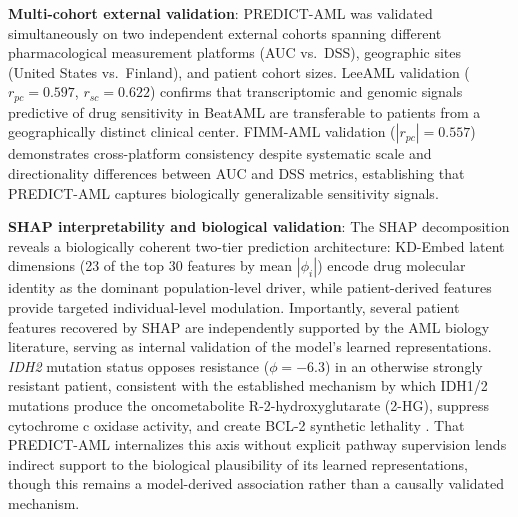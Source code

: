 \documentclass[pdflatex,sn-mathphys-num]{sn-jnl}
\theoremstyle{thmstyleone}
\theoremstyle{thmstyletwo}
\theoremstyle{thmstylethree}
\begin{document}
\textbf{Multi-cohort external validation}: PREDICT-AML was validated simultaneously on two independent external cohorts spanning different pharmacological measurement platforms (AUC vs.\ DSS), geographic sites (United States vs.\ Finland), and patient cohort sizes. LeeAML validation ($r_{pc} = 0.597$, $r_{sc} = 0.622$) confirms that transcriptomic and genomic signals predictive of drug sensitivity in BeatAML are transferable to patients from a geographically distinct clinical center. FIMM-AML validation ($|r_{pc}| = 0.557$) demonstrates cross-platform consistency despite systematic scale and directionality differences between AUC and DSS metrics, establishing that PREDICT-AML captures biologically generalizable sensitivity signals. %

\textbf{SHAP interpretability and biological validation}: The SHAP decomposition reveals a biologically coherent two-tier prediction architecture: KD-Embed latent dimensions (23 of the top 30 features by mean $|\phi_i|$) encode drug molecular identity as the dominant population-level driver, while patient-derived features provide targeted individual-level modulation. Importantly, several patient features recovered by SHAP are independently supported by the AML biology literature, serving as internal validation of the model's learned representations. \textit{IDH2} mutation status opposes resistance ($\phi = -6.3$) in an otherwise strongly resistant patient, consistent with the established mechanism by which IDH1/2 mutations produce the oncometabolite R-2-hydroxyglutarate (2-HG), suppress cytochrome c oxidase activity, and create BCL-2 synthetic lethality \cite{chan2015idh, bisaillon2020genetic}. That PREDICT-AML internalizes this axis without explicit pathway supervision lends indirect support to the biological plausibility of its learned representations, though this remains a model-derived association rather than a causally validated mechanism.
\end{document}
